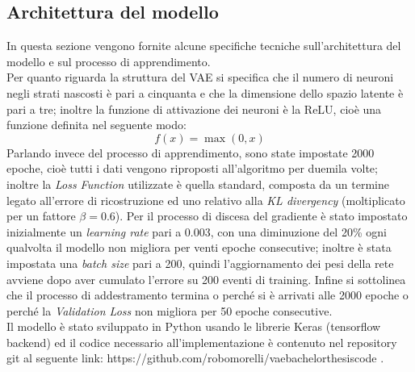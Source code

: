 \subsection{Architettura del modello}
\label{architettura del modello}
In questa sezione vengono fornite alcune specifiche tecniche sull'architettura del modello e sul processo di apprendimento.\\
Per quanto riguarda la struttura del VAE si specifica che il numero di neuroni negli strati nascosti è pari a cinquanta e che la dimensione dello spazio latente è pari a tre; inoltre la funzione di attivazione dei neuroni è la ReLU, cioè una funzione definita nel seguente modo:
\begin{equation}
	f(x) = \max(0,x)
\end{equation} 
Parlando invece del processo di apprendimento, sono state impostate 2000 epoche, cioè tutti i dati vengono riproposti all'algoritmo per duemila volte; inoltre la \textit{Loss Function} utilizzate è quella standard, composta da un termine legato all'errore di ricostruzione ed uno relativo alla \textit{KL divergency} (moltiplicato per un fattore $\beta=0.6$). Per il processo di discesa del gradiente è stato impostato inizialmente un \textit{learning rate} pari a 0.003, con una diminuzione del 20\% ogni qualvolta il modello non migliora per venti epoche consecutive; inoltre è stata impostata una \textit{batch size} pari a 200, quindi l'aggiornamento dei pesi della rete avviene dopo aver cumulato l'errore su 200 eventi di training. Infine si sottolinea che il processo di addestramento termina o perché si è arrivati alle 2000 epoche o perché la \textit{Validation Loss} non migliora per 50 epoche consecutive.\\
Il modello è stato sviluppato in Python usando le librerie Keras (tensorflow backend) ed il codice necessario all'implementazione è contenuto nel repository git al seguente link: https://github.com/robomorelli/vae\textunderscore bachelor\textunderscore thesis\textunderscore code \cite{Codice}.


